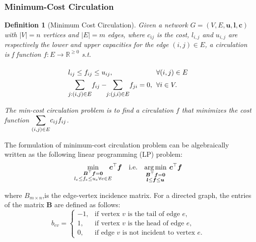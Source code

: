 \documentclass{article} %
\theoremstyle{bfnote}
\newtheorem{definition}[theorem]{Definition}
\newcommand{\adddetail}[2]{\todo[inline, inlinewidth=5cm, author=#2, color=lightpurple]{#1}}
\begin{document}
 \adddetail{Check definition of val(f)}{Behrooz}



\subsubsection{Minimum-Cost Circulation}
\begin{definition}[Minimum Cost Circulation]
	Given a network $G=(V, E, \bm{u}, \bm{l}, \bm{c})$ with $ |V|=n $ vertices and $ |E|=m $ edges, where $c_{i j}$ is the cost, $l_{i, j}$ and $u_{i, j}$ are respectively the lower and upper capacities for the edge $(i,j)\in E$, a circulation is f function $f: E \rightarrow \mathbb{R}^{\geq 0}$ s.t.
	
	\begin{equation}
		\arraycolsep=3pt
		\def\arraystretch{1.5}
		\begin{array}{ll}
			l_{i j} \leq f_{i j} \leq u_{i j}, & \forall(i, j) \in E \\
			\mathlarger{\mathlarger{\sum\limits_{j:(i, j) \in E}}} f_{i j} - \hspace{-3pt} \mathlarger{\mathlarger{\sum\limits_{j:(j, i) \in E}}} f_{j i} = 0, & \forall i \in V .
		\end{array}
		\label{eq:3}
	\end{equation}
	
	The min-cost circulation problem is to find a circulation $f$ that minimizes the cost function $\mathlarger{\sum_{(i, j) \in E}} c_{i j} f_{i j}$. 
	
\end{definition}


The formulation of minimum-cost circulation problem can be algebraically written as the following linear programming (LP) problem:
\begin{equation}
	\underset{\substack{\bm{B}^{\top} \bm{f}=\bm{0} \\ l_e \leq f_e \leq u_e \forall e \in E}}{\min } \hspace{-4pt} \bm{c}^{\top} \bm{f} \quad  \text{i.e.}	\quad 
	\underset{\substack{\bm{B}^{\top} \bm{f}=\bm{0} \\ \bm{l} \leq \bm{f} \leq \bm{u} }}{\arg \min } \hspace{4pt} \bm{c}^{\top} \bm{f}	
	\label{eq:5}
\end{equation}

where $B_{m \times n}$,is the edge-vertex incidence matrix.
For a directed graph, the entries of the matrix $ \bm{B} $ are defined as follows:
\vspace{-2pt}
\begin{equation*}
	b_{e v} =
	\begin{cases}
		-1, & \text{if vertex } v \text{ is the tail of edge } e, \\
		1,  & \text{if vertex } v \text{ is the head of edge } e, \\
		0,  & \text{if edge } v \text{ is not incident to vertex } e.
	\end{cases}
\end{equation*}
\end{document}
